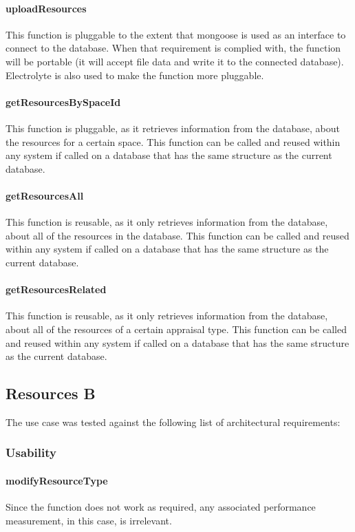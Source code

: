 \documentclass[a4paper]{article}
\begin{document}
\paragraph{uploadResources}
This function is pluggable to the extent that mongoose is used as an interface to connect to the database. When that requirement is complied with, the function will be portable (it will accept file data and write it to the connected database). Electrolyte is also used to make the function more pluggable.

\paragraph{getResourcesBySpaceId}
This function is pluggable, as it retrieves information from the database, about the resources for a certain space. This function can be called and reused within any system if called on a database that has the same structure as the current database.

\paragraph{getResourcesAll}
This function is reusable, as it only retrieves information from the database, about all of the resources in the database. This function can be called and reused within any system if called on a database that has the same structure as the current database.

\paragraph{getResourcesRelated}
This function is reusable, as it only retrieves information from the database, about all of the resources of a certain appraisal type. This function can be called and reused within any system if called on a database that has the same structure as the current database.


\subsection {Resources B}
The use case was tested against the following list of architectural requirements:
\subsubsection {Usability}

\paragraph{modifyResourceType}
Since the function does not work as required, any associated performance measurement, in this case, is irrelevant. 
\end{document}
